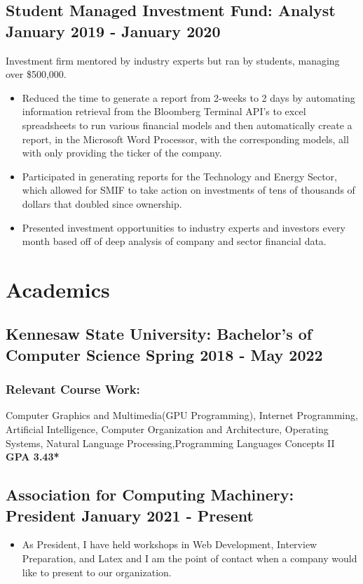 \documentclass{article}
\begin{document}
\subsection{\large Student Managed Investment Fund: Analyst \hfill \small January 2019 - January 2020}
Investment firm mentored by industry experts but ran by students, managing over \$500,000.
\begin{itemize}
\setlength\itemsep{.1em}
	\item Reduced the time to generate a report from 2-weeks to 2 days by automating information retrieval from the Bloomberg Terminal API's to excel spreadsheets to run various financial models and then automatically create a report, in the Microsoft Word Processor, with the corresponding models, all with only providing the ticker of the company. 
	\item Participated in generating reports for the Technology and Energy Sector, which allowed for SMIF to take action on investments of tens of thousands of dollars that doubled since ownership.
	\item Presented investment opportunities to industry experts and investors every month based off of deep analysis of company and sector financial data.
\end{itemize}
\section{Academics}
\subsection{\large Kennesaw State University: Bachelor's of Computer Science \hfill \small Spring 2018 - May 2022}
\subsubsection{Relevant Course Work:} Computer Graphics and Multimedia(GPU Programming), Internet Programming, Artificial Intelligence, Computer Organization and Architecture, Operating Systems, Natural Language Processing,Programming Languages Concepts II \hfill \textbf{GPA 3.43*}
\subsection{\large Association for Computing Machinery: President \hfill \small January 2021 - Present}
\begin{itemize}
\setlength\itemsep{.1em}
	\item As President, I have held workshops in Web Development, Interview Preparation, and Latex and I am the point of contact when a company would like to present to our organization. 
\end{itemize}
\end{document}
